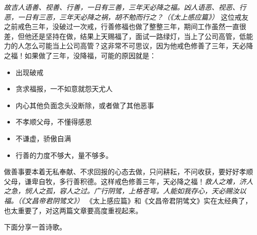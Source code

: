 \begin{case}
    \textit{故吉人语善、视善、行善，一日有三善，三年天必降之福。凶人语恶、视恶、行恶，一日有三恶，三年天必降之祸，胡不勉而行之？（《太上感应篇》）} 这位戒友之前戒色三年，没破过一次戒，行善修福也做了整整三年，期间工作虽然一直很差，但他还是坚持在做，结果上天赐福了，面试一路绿灯，当上了公司高管，低能力的人怎么可能当上公司高管？这非常不可思议，因为他戒色修善了三年，天必降之福！如果做了三年，没降福，可能的原因就是：\begin{multicols}{2}
        \begin{itemize}
            \item 出现破戒
            \item 贪求福报，一不如意就怨天尤人
            \item 内心其他负面念头没断除，或者做了其他恶事
            \item 不孝顺父母，不懂得感恩
            \item 不谦虚，骄傲自满
            \item 行善的力度不够大，量不够多。
        \end{itemize}
    \end{multicols} 做善事要本着无私奉献、不求回报的心态去做，只问耕耘，不问收获，要好好孝顺父母，谦卑自牧，多行善积德。这样戒色修善三年，天必降之福！\textit{救人之难，济人之急，悯人之孤，容人之过。广行阴骘，上格苍穹。人能如我存心，天必赐汝以福。（《文昌帝君阴骘文》）} 《太上感应篇》和《文昌帝君阴骘文》实在太经典了，也太重要了，对这两篇文章要高度重视起来。
\end{case}

下面分享一首诗歌。

